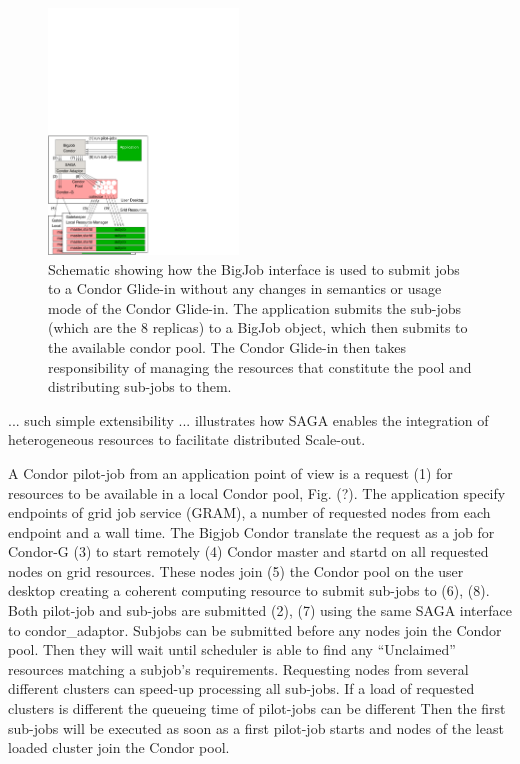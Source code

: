 \documentclass[conference,final]{IEEEtran}
\begin{document}
\begin{figure}[!ht]
 \begin{center}
     \includegraphics[width=0.45\textwidth]{figures/bigjob_condor}
 \end{center}
 \caption{\small Schematic showing how the BigJob interface is used to
   submit jobs to a Condor Glide-in without any changes in semantics
   or usage mode of the Condor Glide-in. The application submits the
   sub-jobs (which are the 8 replicas) to a BigJob object, which then
   submits to the available condor pool. The Condor Glide-in then
   takes responsibility of managing the resources that constitute the
   pool and distributing sub-jobs to them.} \label{Fig:saga-condor}
\end{figure}

... such simple extensibility ... illustrates how SAGA enables the
integration of heterogeneous resources to facilitate distributed
Scale-out.

A Condor pilot-job from an application point of view is a request (1)
for resources to be available in a local Condor pool, Fig. (?). The
application specify endpoints of grid job service (GRAM), a number of
requested nodes from each endpoint and a wall time. The Bigjob Condor
translate the request as a job for Condor-G (3) to start remotely (4)
Condor master and startd on all requested nodes on grid
resources. These nodes join (5) the Condor pool on the user desktop
creating a coherent computing resource to submit sub-jobs to (6),
(8). Both pilot-job and sub-jobs are submitted (2), (7) using the same
SAGA interface to condor\_adaptor. Subjobs can be submitted before any
nodes join the Condor pool. Then they will wait until scheduler is
able to find any “Unclaimed” resources matching a subjob's
requirements. Requesting nodes from several different clusters can
speed-up processing all sub-jobs. If a load of requested clusters is
different the queueing time of pilot-jobs can be different Then the
first sub-jobs will be executed as soon as a first pilot-job starts
and nodes of the least loaded cluster join the Condor pool.
\end{document}
